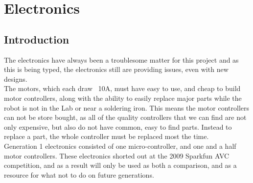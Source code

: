 \documentclass{article}
\begin{document}
\section{Electronics}
\subsection{Introduction}
The electronics have always been a troublesome matter for this project and as this is being typed, the electronics still are providing issues, even with new designs.\\
The motors, which each draw ~10A, must have easy to use, and cheap to build motor controllers, along with the ability to easily replace major parts while the robot is not in the Lab or near a soldering iron. This means the motor controllers can not be store bought, as all of the quality controllers that we can find are not only expensive, but also do not have common, easy to find parts. Instead to replace a part, the whole controller must be replaced most the time.\\
Generation 1 electronics consisted of one micro-controller, and one and a half motor controllers. These electronics shorted out at the 2009 Sparkfun AVC competition, and as a result will only be used as both a comparison, and as a resource for what not to do on future generations.\\
\end{document}
